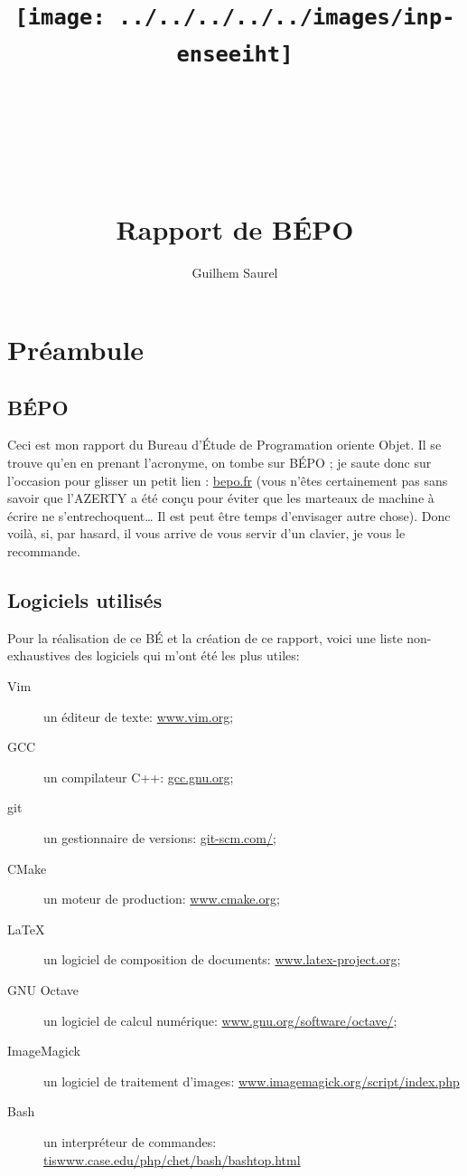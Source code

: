 \documentclass{report}
\title{\texttt{[image: ../../../../../images/inp-enseeiht]} \\ ~ \\ ~ \\ ~ \\ ~ \\ Rapport de BÉPO}
\author{Guilhem Saurel}
\date{\oldstylenums{\today}}
\begin{document}
\begin{titlepage}
    \setcounter{page}{0}
    \maketitle
    \thispagestyle{empty}
\end{titlepage}

\tableofcontents



\section{Préambule}
\subsection{BÉPO}
Ceci est mon rapport du Bureau d’Étude de Programation oriente Objet. Il se trouve qu’en en prenant
l’acronyme, on tombe sur BÉPO ; je saute donc sur l’occasion pour glisser un petit lien : \url{bepo.fr}
(vous n’êtes certainement pas sans savoir que l’AZERTY a été conçu pour éviter que les marteaux de 
machine à écrire ne s’entrechoquent… Il est peut être temps d’envisager autre chose). Donc voilà, si,
par hasard, il vous arrive de vous servir d’un clavier, je vous le recommande.

\subsection{Logiciels utilisés}
Pour la réalisation de ce BÉ et la création de ce rapport, voici une liste non-exhaustives des 
logiciels qui m’ont été les plus utiles:
\begin{description}
	\item[Vim] un éditeur de texte: \url{www.vim.org};
	\item[GCC] un compilateur C++: \url{gcc.gnu.org};
	\item[git] un gestionnaire de versions: \url{git-scm.com/};
	\item[CMake] un moteur de production: \url{www.cmake.org};
	\item[\LaTeX] un logiciel de composition de documents: \url{www.latex-project.org};
	\item[GNU Octave] un logiciel de calcul numérique: \url{www.gnu.org/software/octave/};
	\item[ImageMagick] un logiciel de traitement d’images: \url{www.imagemagick.org/script/index.php}
	\item[Bash] un interpréteur de commandes: \url{tiswww.case.edu/php/chet/bash/bashtop.html}
\end{description}
\end{document}
